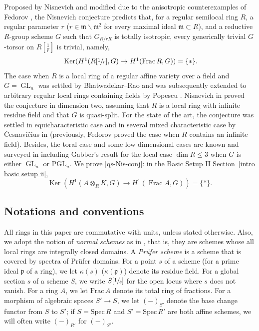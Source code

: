 \documentclass[JEP,XML,SOM,Unicode,published]{cedram}
\let\ts\textstyle
\let\backslash\smallsetminus
\newcommand{\fm}{\mathfrak{m}}
\providecommand{\f}[2]{\frac{#1}{#2}}
\DeclareMathOperator{\Ker}{Ker}
\DeclareMathOperator{\Frac}{Frac}
\DeclareMathOperator{\GL}{GL}
\theoremstyle{plain}
\theoremstyle{definition}
\begin{document}
Proposed by Nisnevich \cite[Conj.\,1.3]{Nis89} and modified due to the anisotropic counterexamples of Fedorov \cite[Prop.\,4.1]{Fed22b}, the Nisnevich conjecture predicts that, for a regular semilocal ring $R$, a regular parameter $r$ (\ie $r\in \fm\backslash \fm^2$ for every maximal ideal $\fm\subset R$), and a reductive $R$-group scheme $G$ such that $G_{R/rR}$ is totally isotropic, every generically trivial $G$-torsor on $R[\f{1}{r}]$ is trivial, namely,
\[
\ts \text{ $\Ker(H^1(R[\sfrac{1}{r}],G)\to H^1(\Frac R,G))=\{\ast\}$.}
\]
The case when $R$ is a local ring of a regular affine variety over a field and $G=\GL_n$ was settled by Bhatwadekar--Rao \cite{BR83} and was subsequently extended to arbitrary regular local rings containing fields by Popescu \cite[Th.\,1]{Pop02}.
Nisnevich in \cite{Nis89} proved the conjecture in dimension two, assuming that $R$ is a local ring with infinite residue field and that $G$ is quasi-split.
For the state of the art, the conjecture was settled in equicharacteristic case and in several mixed characteristic case by {\v{C}}esnavi{\v{c}}ius in \cite[Th.\,1.3]{Ces22b} (previously, Fedorov \cite{Fed21} proved the case when $R$ contains an infinite field).
Besides, the toral case and some low dimensional cases are known and surveyed in \cite[\S3.4.2(1)]{Ces22b} including Gabber's result \cite[Chap.\,1, Th.\,1]{Gab81} for the local case $\dim R\leq 3$ when $G$ is either $\GL_n$ or $\mathrm{PGL}_n$.
We prove \eqref{qs-Nis-conj}: in the Basic Setup II Section~\ref{intro basic setup ii},
\[
\Ker \left(H^1(A\otimes_RK,G)\to H^1(\Frac A,G)\right) =\{*\}.
\]

\subsection{Notations and conventions}\label{notation-convention}
All rings in this paper are commutative with units, unless stated otherwise.
{Also, we adopt the notion of \emph{normal schemes} as in \cite[4.1.4]{EGAI}, that is, they are schemes whose all local rings are integrally closed domains.
A \emph{Prüfer scheme} is a scheme that is covered by spectra of Prüfer domains.}
For a point $s$ of a scheme (\resp for a prime ideal $\mathfrak{p}$ of a ring), we let $\kappa(s)$ (\resp $\kappa(\mathfrak{p})$) denote its residue
field. For a global section $s$ of a scheme $S$, we write $S[\sfrac{1}{s}]$ for the open locus where $s$ does not
vanish. For a ring $A$, we let $\text{Frac}\, A$ denote its total ring of fractions.
For a morphism of algebraic spaces $S'\to S$, we let $(-)_{S'}$ denote the base change functor from $S$ to $S'$; if $S=\text{Spec}\,R$ and $S'=\text{Spec}\,R'$ are both affine schemes, we will often write $(-)_{R'}$ for $(-)_{S'}$.
\end{document}
